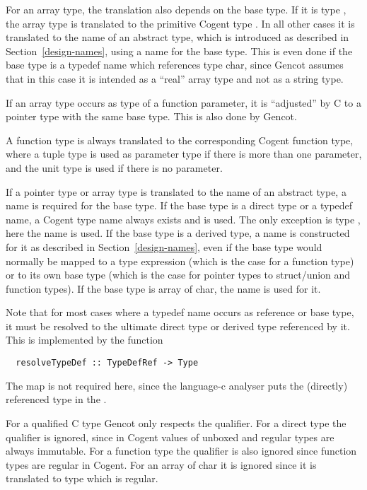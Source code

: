 For an array type, the translation also depends on the base type. If it is type , the array 
type is translated to the primitive Cogent type . In all other cases it is translated 
to the name of an abstract type, which is introduced as described in Section~\ref{design-names}, 
using a name for the base type. This is even done if the base type is a typedef name which references
type char, since Gencot assumes that in this case it is intended as a ``real'' array type and not
as a string type.

If an array type occurs as type of a function parameter, it is ``adjusted'' by C to a pointer type with
the same base type. This is also done by Gencot. 

A function type is always translated to the corresponding Cogent function type, where a tuple type is
used as parameter type if there is more than one parameter, and the unit type is used if there is
no parameter. 

If a pointer type or array type is translated to the name of an abstract type, a name is required for
the base type. If the base type is a direct type or a typedef name, a Cogent type name always exists 
and is used. The only exception is type , here the name  is used.
If the base type is a derived type, a name is constructed for it as described in Section~\ref{design-names},
even if the base type would normally be mapped to a type expression (which is the case for a function type)
or to its own base type (which is the case for pointer types to struct/union and function types). If the
base type is array of char, the name  is used for it. 

Note that for most cases where a typedef name occurs as reference or base type, it must be resolved to
the ultimate direct type or derived type referenced by it. This is implemented by the function
\begin{verbatim}
  resolveTypeDef :: TypeDefRef -> Type 
\end{verbatim}
The  map is not required here, since the language-c analyser puts the (directly) 
referenced type in the . 

For a qualified C type Gencot only respects the  qualifier. For a direct type the 
qualifier is ignored, since in Cogent values of unboxed and regular types are always immutable. For
a function type the qualifier is also ignored since function types are regular in Cogent. For an array
of char it is ignored since it is translated to type  which is regular.

